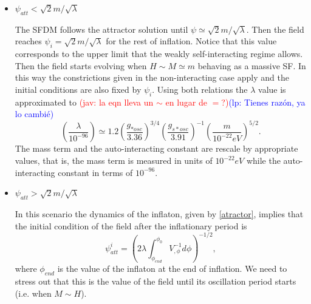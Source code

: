\documentclass[amssymb,twocolumn,prd,nofootinbib,showpacs]{revtex4-1}
\newcommand{\jav}[1]{\textcolor{red}{(jav: #1)}}
\newcommand{\lp}[1]{\textcolor{blue}{(lp: #1)}}
\begin{document}
\begin{itemize}
\item $\psi_{att}<\sqrt{2}m/\sqrt{\lambda}$

The SFDM follows the attractor solution until $\psi\simeq \sqrt{2}m/\sqrt{\lambda}$. Then the field 
reaches $\psi_i=\sqrt{2}m/\sqrt{\lambda}$ for the rest of inflation. Notice that this value corresponds to the upper 
limit that the weakly self-interacting regime allows. 
%
Then the field starts evolving when $H\sim M\simeq m$ behaving as a massive SF. In this way the constrictions 
given in the non-interacting case apply and the initial conditions are also fixed by $\psi_i$. 
Using both relations the $\lambda$ value is approximated to \jav{la eqn lleva un $\sim$ en lugar de $=$?}\lp{Tienes raz\'on, ya lo cambi\'e}
%
\begin{equation}\label{wregime}
\left(\frac{\lambda}{10^{-96}}\right)\simeq 1.2\left(\frac{g_{*osc}}{3.36}\right)^{3/4}\left(\frac{g_{s*osc}}{3.91}\right)^{-1}\left(\frac{m}{10^{-22}eV}\right)^{5/2}.
\end{equation}
%
The mass term and the auto-interacting constant are rescale by appropriate values, that is, the mass term is measured 
in units of $10^{-22}eV$ while the auto-interacting constant in terms of $10^{-96}$.
\\

\item $\psi_{att}>\sqrt{2}m/\sqrt{\lambda}$

In this scenario the dynamics of the inflaton, given by \eqref{atractor}, implies that the initial condition 
of the field after the inflationary period is
%
\begin{equation}\label{atractor2}
\psi_{att}^i = \left(2\lambda\int_{\phi_{end}}^{\phi_0}V^{-1}_{,\phi}d\phi\right)^{-1/2},
\end{equation}
%
where $\phi_{end}$ is the value of the inflaton at the end of inflation. 
We need to stress out that this is the value of the field until its oscillation period starts (i.e. when $M\sim H$).


\end{itemize}
\end{document}
